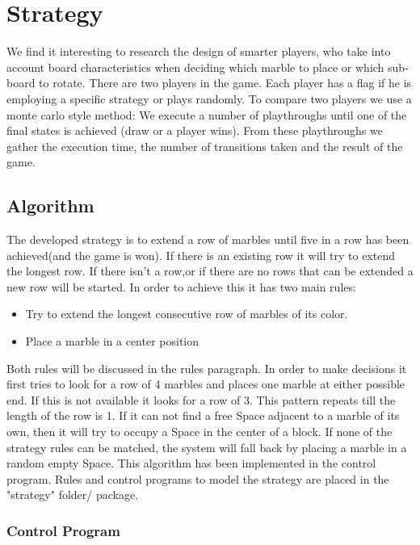 \section{Strategy}
\label{Strategy}
We find it interesting to research the design of smarter players, who take into account board characteristics when deciding which marble to place or which sub-board to rotate.
There are two players in the game. Each player has a flag if he is employing a specific strategy or plays randomly. 
To compare two players we use a monte carlo style method: We execute a number of playthroughs until one of the final states is achieved (draw or a player wins).
From these playthroughs we gather the execution time, the number of transitions taken and the result of the game.

\vspace{6pt}
\subsection{Algorithm}
The developed strategy is to extend a row of marbles until five in a row has been achieved(and the game is won).
If there is an existing row it will try to extend the longest row.
If there isn't a row,or if there are no rows that can be extended a new row will be started.
 In order to achieve this it has two main rules:
\begin{itemize}
\item Try to extend the longest consecutive row of marbles of its color.
\item Place a marble in a center position
\end{itemize}
Both rules will be discussed in the rules paragraph.
In order to make decisions it first tries to look for a row of 4 marbles and places one marble at either possible end. If this is not available it looks for a row of 3. This pattern repeats till the length of the row is 1.
If it can not find a free Space adjacent to a marble of its own, then it will try to occupy a Space in the center of a block.
If none of the strategy rules can be matched, the system will fall back by placing a marble in a random empty Space.
This algorithm has been implemented in the control program.
Rules and control programs to model the strategy are placed in the "strategy" folder/ package.

\subsubsection{Control Program}

